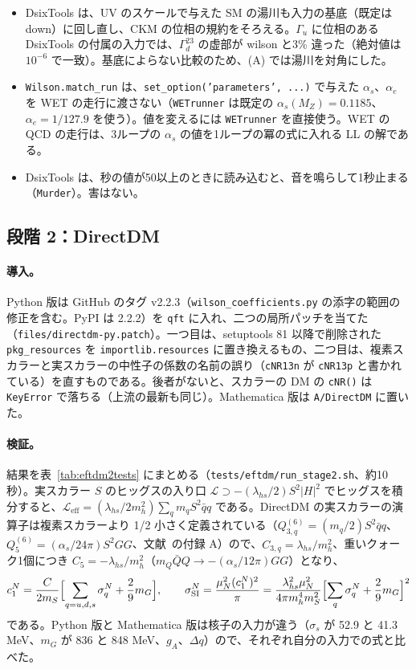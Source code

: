 \documentclass[a4paper,10pt]{ltjsarticle}
\begin{document}
\begin{itemize}
\item DsixTools は、UV のスケールで与えた SM の湯川も入力の基底（既定は down）に回し直し、CKM の位相の規約をそろえる。$\Gamma_u$ に位相のある DsixTools の付属の入力では、$\Gamma_d^{23}$ の虚部が wilson と3\% 違った（絶対値は $10^{-6}$ で一致）。基底によらない比較のため、(A) では湯川を対角にした。
\item \texttt{Wilson.match\_run} は、\texttt{set\_option('parameters', ...)} で与えた $\alpha_s$、$\alpha_e$ を WET の走行に渡さない（\texttt{WETrunner} は既定の $\alpha_s(M_Z)=0.1185$、$\alpha_e=1/127.9$ を使う）。値を変えるには \texttt{WETrunner} を直接使う。WET の QCD の走行は、3ループの $\alpha_s$ の値を1ループの冪の式に入れる LL の解である。
\item DsixTools は、秒の値が50以上のときに読み込むと、音を鳴らして1秒止まる（\texttt{Murder}）。害はない。
\end{itemize}

\subsection{段階 2：DirectDM}\label{sec:eftdm2}

\paragraph{導入。}Python 版は GitHub のタグ v2.2.3（\texttt{wilson\_coefficients.py} の添字の範囲の修正を含む。PyPI は 2.2.2）を \texttt{qft} に入れ、二つの局所パッチを当てた（\nolinkurl{files/directdm-py.patch}）。一つ目は、setuptools 81 以降で削除された \texttt{pkg\_resources} を \texttt{importlib.resources} に置き換えるもの、二つ目は、複素スカラーと実スカラーの中性子の係数の名前の誤り（\texttt{cNR13n} が \texttt{cNR13p} と書かれている）を直すものである。後者がないと、スカラーの DM の \texttt{cNR()} は \texttt{KeyError} で落ちる（上流の最新も同じ）。Mathematica 版は \texttt{A/DirectDM} に置いた。

\paragraph{検証。}結果を表~\ref{tab:eftdm2tests} にまとめる（\nolinkurl{tests/eftdm/run_stage2.sh}、約10秒）。実スカラー $S$ のヒッグスの入り口 $\mathcal L\supset-(\lambda_{hs}/2)S^2|H|^2$ でヒッグスを積分すると、$\mathcal L_{\mathrm{eff}}=(\lambda_{hs}/2m_h^2)\sum_q m_qS^2\bar qq$ である。DirectDM の実スカラーの演算子は複素スカラーより 1/2 小さく定義されている（$Q_{3,q}^{(6)}=(m_q/2)S^2\bar qq$、$Q_5^{(6)}=(\alpha_s/24\pi)S^2GG$、文献~\cite{directdm}の付録 A）ので、$C_{3,q}=\lambda_{hs}/m_h^2$、重いクォーク1個につき $C_5=-\lambda_{hs}/m_h^2$（$m_Q\bar QQ\to-(\alpha_s/12\pi)GG$）となり、
\[
c_1^N=\frac{C}{2m_S}\Bigl[\sum_{q=u,d,s}\sigma_q^N+\frac29m_G\Bigr],\qquad
\sigma_{\mathrm{SI}}^N=\frac{\mu_N^2(c_1^N)^2}{\pi}=\frac{\lambda_{hs}^2\mu_N^2}{4\pi m_h^4m_S^2}\Bigl[\sum_q\sigma_q^N+\frac29m_G\Bigr]^2
\]
である。Python 版と Mathematica 版は核子の入力が違う（$\sigma_s$ が 52.9 と 41.3 MeV、$m_G$ が 836 と 848 MeV、$g_A$、$\Delta q$）ので、それぞれ自分の入力での式と比べた。
\end{document}
